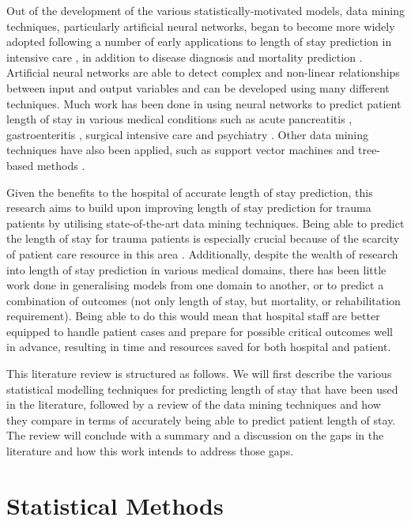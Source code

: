 Out of the development of the various statistically-motivated models, data
mining techniques, particularly artificial neural networks,
began to become more widely adopted following a number of
early applications to length of stay prediction in intensive
care \citep{Tu1993,Dybowski1996}, in addition to disease diagnosis and mortality
prediction \citep{Silva2006}. Artificial neural networks are able to detect
complex and non-linear relationships between input and output variables and can
be developed using many different techniques. Much work has been done in using
neural networks to predict patient length of stay in various medical conditions
such as acute pancreatitis \citep{Walczak2003}, gastroenteritis \citep{Ng2006},
surgical intensive care \citep{Buchman1994,Tu1993} and
psychiatry \citep{Lowell1997}. Other data mining techniques have also been
applied, such as support vector machines and tree-based
methods \citep{Harper2005}.

Given the benefits to the hospital of accurate length of stay prediction,
this research aims to build upon improving length of stay prediction for trauma
patients by utilising state-of-the-art data mining techniques. Being able to
predict the length of stay for trauma patients is especially crucial because of
the scarcity of patient care resource in this area \citep{Yang2010}.
Additionally,
despite the wealth of research into length of stay prediction in various
medical domains, there has been little work done in generalising models from
one domain to another, or to predict a combination of outcomes (not only
length of stay, but mortality, or rehabilitation requirement). Being able to
do this would mean that hospital staff are better equipped to handle patient
cases and prepare for possible critical outcomes well in advance, resulting
in time and resources saved for both hospital and patient.

This literature review is structured as follows. We will first describe the
various statistical modelling techniques for predicting length of stay that
have been used in the literature, followed by a review of the data mining
techniques and how they compare in terms of accurately being able to predict
patient length of stay. The review will conclude with a summary and a
discussion on the gaps in the literature and how this work intends to address
those gaps.

\section{Statistical Methods}
